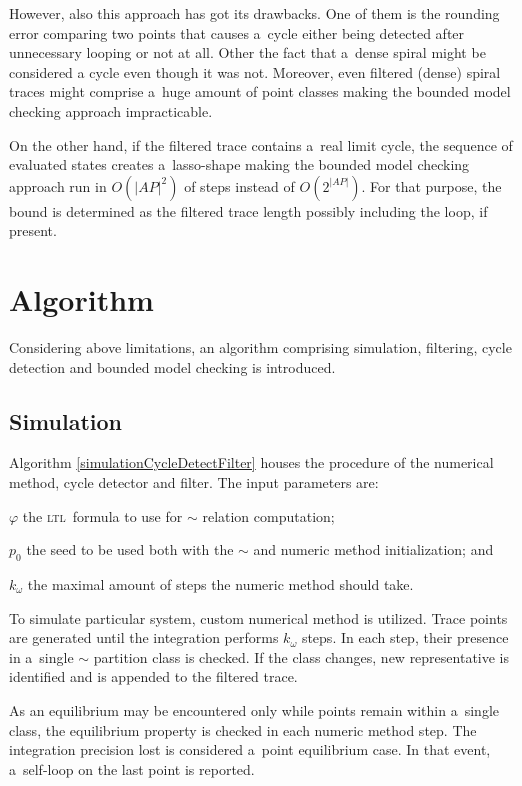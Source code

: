 \documentclass[12pt,twoside,draft]{fithesis}
\newcommand{\ltl}{\textsc{ltl}~}
\begin{document}
However, also this approach has got its drawbacks. One of them
is the rounding error comparing two points that causes a~cycle either
being detected after unnecessary looping or not at all. Other the fact
that a~dense spiral might be considered a cycle even though it was not.
Moreover, even filtered (dense) spiral traces might comprise a~huge
amount of point classes making the bounded model checking approach
impracticable.

On the other hand, if the filtered trace contains a~real limit cycle,
the sequence of evaluated states creates a~lasso-shape making the
bounded model checking approach run in $O(|AP|^2)$ of steps
instead of $O(2^{|AP|})$\cite{biere}. For that purpose, the bound is
determined as the filtered trace length possibly including the loop, if
present.

\section{Algorithm}
Considering above limitations, an algorithm comprising simulation,
filtering, cycle detection and bounded model checking is introduced.
\subsection*{Simulation}
Algorithm \ref{simulationCycleDetectFilter} houses the procedure of
the numerical method, cycle detector and filter. The input parameters are:
\begin{inparaenum}
	\item{$\varphi$} the \ltl formula to use for $\sim$ relation
		computation;
	\item{$p_0$} the seed to be used both with the $\sim$ and numeric
		method initialization; and
	\item{$k_{\omega}$} the maximal amount of steps the numeric method
		should take.
\end{inparaenum}

To simulate particular system, custom numerical method is utilized.
Trace points are generated until the integration performs $k_{\omega}$
steps. In each step, their presence in a~single $\sim$ partition class
is checked. If the class changes, new representative is identified
and is appended to the filtered trace.

As an equilibrium may be encountered only while points remain within
a~single class, the equilibrium property is checked in each numeric
method step. The integration precision lost is considered a~point
equilibrium case. In that event, a~self-loop on the last point is
reported.
\end{document}

